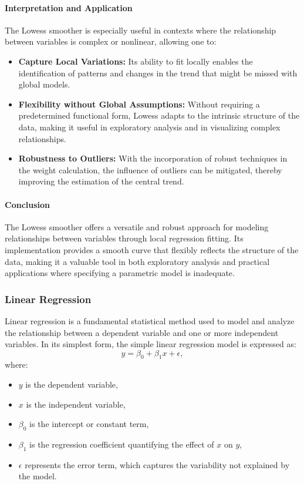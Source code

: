 \documentclass[10pt]{article}
\begin{document}
\paragraph{Interpretation and Application}  
The Lowess smoother is especially useful in contexts where the relationship between variables is complex or nonlinear, allowing one to:
\begin{itemize}
    \item \textbf{Capture Local Variations:} Its ability to fit locally enables the identification of patterns and changes in the trend that might be missed with global models.
    \item \textbf{Flexibility without Global Assumptions:} Without requiring a predetermined functional form, Lowess adapts to the intrinsic structure of the data, making it useful in exploratory analysis and in visualizing complex relationships.
    \item \textbf{Robustness to Outliers:} With the incorporation of robust techniques in the weight calculation, the influence of outliers can be mitigated, thereby improving the estimation of the central trend.
\end{itemize}

\paragraph{Conclusion}  
The Lowess smoother offers a versatile and robust approach for modeling relationships between variables through local regression fitting. Its implementation provides a smooth curve that flexibly reflects the structure of the data, making it a valuable tool in both exploratory analysis and practical applications where specifying a parametric model is inadequate.

\subsubsection{Linear Regression}
Linear regression is a fundamental statistical method used to model and analyze the relationship between a dependent variable and one or more independent variables. In its simplest form, the simple linear regression model is expressed as:
\[
y = \beta_0 + \beta_1 x + \epsilon,
\]
where:
\begin{itemize}
    \item \( y \) is the dependent variable,
    \item \( x \) is the independent variable,
    \item \( \beta_0 \) is the intercept or constant term,
    \item \( \beta_1 \) is the regression coefficient quantifying the effect of \( x \) on \( y \),
    \item \( \epsilon \) represents the error term, which captures the variability not explained by the model.
\end{itemize}
\end{document}
